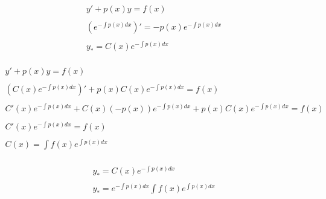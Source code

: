 
\begin{gather*}
    y' + p(x)y = f(x) \tag{recall} \\ \\
    (e^{-\int p(x)dx})' = -p(x)e^{-\int p(x)dx} \tag{notice} \\ \\
    y_* = C(x)e^{-\int p(x)dx} \tag{consider} \\
\end{gather*}

\begin{gather*}
    y' + p(x)y = f(x) \\ \\
    (C(x)e^{-\int p(x)dx})' + p(x)C(x)e^{-\int p(x)dx} = f(x) \\ \\
    C'(x)e^{-\int p(x)dx} + C(x)(-p(x))e^{-\int p(x)dx} + p(x)C(x)e^{-\int p(x)dx} = f(x) \\ \\
    C'(x)e^{-\int p(x)dx} = f(x) \\ \\
    C(x) = \int f(x)e^{\int p(x)dx} \\
\end{gather*}

\begin{gather*}
    y_* = C(x)e^{-\int p(x)dx} \\ \\
    \boxed{y_* = e^{-\int p(x)dx}\int f(x)e^{\int p(x)dx}} \\ \\
\end{gather*}
